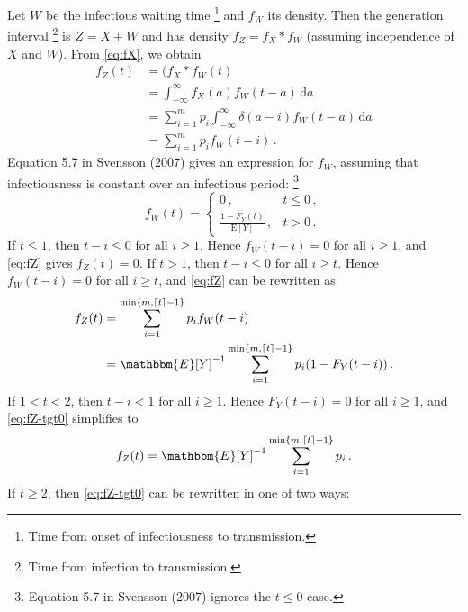 \documentclass[12pt]{article}
\begin{document}
Let $W$ be the infectious waiting time%
\footnote{Time from onset of infectiousness to transmission.}
and $f_W$ its density. Then the generation interval%
\footnote{Time from infection to transmission.}
is $Z = X + W$ and has density $f_Z = f_X * f_W$
(assuming independence of $X$ and $W$).
From \eqref{eq:fX}, we obtain
%
\begin{equation}
  \label{eq:fZ}
  \begin{aligned}
    f_Z(t)
    &= (f_X * f_W(t) \\
    &= \int_{-\infty}^{\infty} f_X(a) f_W(t - a)\,\text{d}a \\
    &= \sum_{i=1}^{m} p_i \int_{-\infty}^{\infty} \delta(a - i) f_W(t - a)\,\text{d}a \\
    &= \sum_{i=1}^{m} p_i f_W(t - i)\,.
  \end{aligned}
\end{equation}
%
Equation 5.7 in Svensson (2007) gives an expression for $f_W$,
assuming that infectiousness is constant over an infectious period:%
\footnote{Equation 5.7 in Svensson (2007) ignores the $t \leq 0$ case.}
%
\begin{equation}
  \label{eq:fW}
  f_W(t) = \begin{cases} 0\,, & t \leq 0\,, \\ \frac{1 - F_Y(t)}{\mathrm{E}[Y]}\,, & t > 0\,. \end{cases}
\end{equation}
%
If $t \leq 1$, then $t - i \leq 0$ for all $i \geq 1$. Hence
$f_W(t - i) = 0$ for all $i \geq 1$, and \eqref{eq:fZ} gives
$f_Z(t) = 0$. If $t > 1$, then $t - i \leq 0$ for all
$i \geq t$. Hence $f_W(t - i) = 0$ for all $i \geq t$, and
\eqref{eq:fZ} can be rewritten as
%
\begin{equation}
  \begin{aligned}
    \label{eq:fZ-tgt0}
    f_Z(t)
    &= \sum_{i=1}^{\min\{m, \lceil t \rceil-1\}} p_i f_W(t - i) \\
    &= \mathbbm{E}[Y]^{-1} \sum_{i=1}^{\min\{m, \lceil t \rceil-1\}} p_i (1 - F_Y(t - i))\,.
  \end{aligned}
\end{equation}
%
If $1 < t < 2$, then $t - i < 1$ for all $i \geq 1$. Hence
$F_Y(t - i) = 0$ for all $i \geq 1$, and \eqref{eq:fZ-tgt0}
simplifies to
%
\begin{equation}
  f_Z(t) = \mathbbm{E}[Y]^{-1} \sum_{i=1}^{\min\{m, \lceil t \rceil-1\}} p_i\,.
\end{equation}
%
If $t \geq 2$, then \eqref{eq:fZ-tgt0} can be rewritten in
one of two ways:
\end{document}
